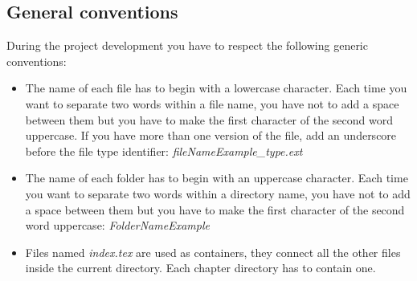 \subsection{General conventions}
During the project development you have to respect the following generic conventions:
\begin{itemize}
  \item The name of each file has to begin with a lowercase character. Each time you want to separate two words within a file name, you have not to add a space between them but you have to make the first character of the second word uppercase. If you have more than one version of the file, add an underscore before the file type identifier: \textit{fileNameExample\_type.ext}
  \item The name of each folder has to begin with an uppercase character. Each time you want to separate two words within a directory name, you have not to add a space between them but you have to make the first character of the second word uppercase: \textit{FolderNameExample}
  \item Files named \textit{index.tex} are used as containers, they connect all the other files inside the current directory. Each chapter directory has to contain one.
\end{itemize}

\newpage

